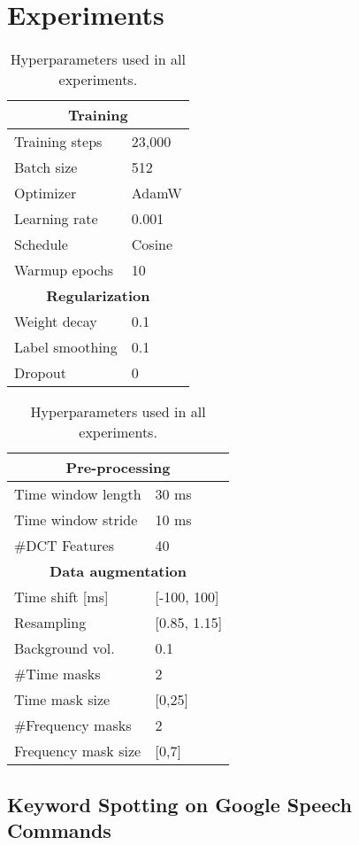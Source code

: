 \documentclass[a4paper]{article}
\begin{document}
\section{Experiments}

\begin{table}[t]
\scriptsize
\caption{Hyperparameters used in all experiments.}
\label{tab:hyperparams}
\centering
\begin{tabular}{ll}
\toprule
\multicolumn{2}{c}{\textbf{Training}} \\
\midrule
Training steps & 23,000 \\
Batch size & 512 \\
Optimizer & AdamW \\
Learning rate & 0.001 \\
Schedule & Cosine \\
Warmup epochs & 10 \\
\midrule
\multicolumn{2}{c}{\textbf{Regularization}} \\
\midrule
Weight decay & 0.1 \\
Label smoothing & 0.1 \\
Dropout & 0 \\ 
\bottomrule
\end{tabular}
\qquad
\begin{tabular}{ll}
\toprule
\multicolumn{2}{c}{\textbf{Pre-processing}} \\
\midrule
Time window length & 30 ms \\
Time window stride & 10 ms \\
\#DCT Features & 40 \\
\midrule
\multicolumn{2}{c}{\textbf{Data augmentation}} \\
\midrule
Time shift [ms] & [-100, 100] \\
Resampling & [0.85, 1.15] \\
Background vol. & 0.1 \\
\#Time masks & 2 \\
Time mask size & [0,25] \\
\#Frequency masks & 2 \\
Frequency mask size & [0,7] \\
\bottomrule
\end{tabular}
\end{table}

\subsection{Keyword Spotting on Google Speech Commands}
\end{document}
